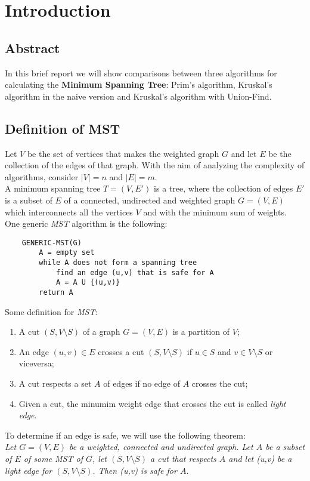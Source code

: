 \section{Introduction}


\subsection{Abstract}
In this brief report we will show comparisons between three algorithms for calculating the \textbf{Minimum Spanning Tree}: Prim's algorithm, Kruskal's algorithm in the naive version and Kruskal's algorithm with Union-Find.

\subsection{Definition of MST}
Let $V$ be the set of vertices that makes the weighted graph $G$ and let $E$ be the collection of the edges of that graph. With the aim of analyzing the complexity of algorithms, consider $|V| = n$ and $|E| = m$. \\
A minimum spanning tree $T = (V,E')$ is a tree, where the collection of edges $E'$ is a subset of $E$ of a connected, undirected and weighted graph $G = (V,E)$ which interconnects all the vertices $V$ and with the minimum sum of weights. \\
\noindent
One generic \textit{MST} algorithm is the following: 
\begin{verbatim}
    GENERIC-MST(G)
        A = empty set
        while A does not form a spanning tree
            find an edge (u,v) that is safe for A
            A = A U {(u,v)}
        return A
\end{verbatim}
\noindent
Some definition for \textit{MST}:
\begin{enumerate}
    \item A cut $(S, V \setminus S)$ of a graph $G = (V, E)$ is a partition of $V$;
    \item An edge $(u,v) \in E$ crosses a cut $(S, V \setminus S)$ if $u\in S$ and $v \in V \setminus S$ or viceversa;
    \item A cut respects a set $A$ of edges if no edge of $A$ crosses the cut;
    \item Given a cut, the minumim weight edge that crosses the cut is called \textit{light edge}.
\end{enumerate}
\noindent
To determine if an edge is safe, we will use the following theorem: \\

\noindent
\textit{ Let $G = (V,E)$ be a weighted, connected and undirected graph. Let $A$ be a subset of $E$ of some \textit{MST} of $G$, let $(S, V \setminus S)$ a cut that respects $A$ and let (u,v) be a light edge for $(S, V \setminus S)$. Then (u,v) is safe for $A$}.